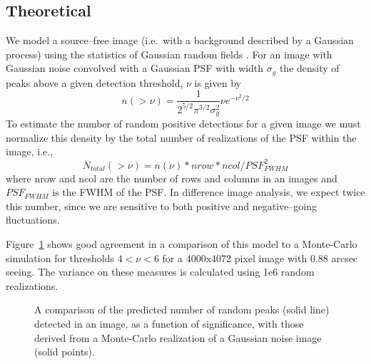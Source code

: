 \documentclass[prd, nofootinbib, floatfix, 11pt,tightenlines,times]{article}
\begin{document}
\subsection{Theoretical \label{sec-analyticfp}}

We model a source--free image (i.e.\ with a background described by a
Gaussian process) using the statistics of Gaussian random fields \citep{Kaiser-PointSources}.  
For an image with Gaussian noise convolved with a
Gaussian PSF with width $\sigma_g$ the density of peaks above a given
detection threshold, $\nu$ is given by 
\begin{equation}
n(>\nu) = \frac{1}{2^{5/2}\pi^{3/2}\sigma_g^{2}} \nu e^{-\nu^2 /2} 
\label{eq-theory}
\end{equation}
 To estimate the number of random
positive detections for a given image we must normalize this density
by the total number of realizations of the PSF within the image, i.e.,
\begin{equation}
N_{total}(>\nu) = n(\nu)*nrow*ncol/PSF_{FWHM}^2
\end{equation}
where nrow and ncol are the number of rows and columns in an images
and $PSF_{FWHM}$ is the FWHM of the PSF.  In difference image analysis, we expect
twice this number, since we are sensitive to both positive and negative--going
fluctuations.

Figure~\ref{fig:peaks} shows good agreement in a comparison of this
model to a Monte-Carlo simulation for thresholds $4<\nu<6$ for a
4000x4072 pixel image with 0.88 arcsec seeing. The variance on these
measures is calculated using 1e6 random realizations.
\begin{figure}
\caption{A comparison of the predicted number of random peaks (solid
  line) detected in an image, as a function of significance, with
  those derived from a Monte-Carlo realization of a Gaussian noise
  image (solid points).}
\label{fig:peaks}
\end{figure}
\end{document}
